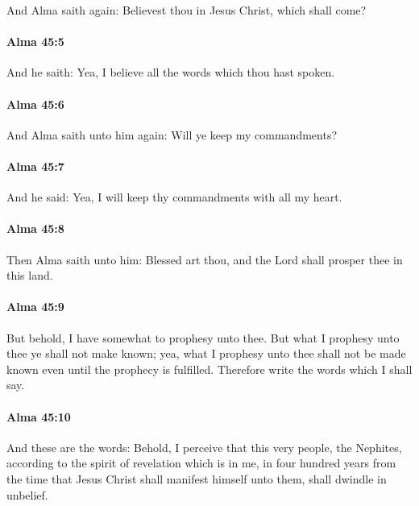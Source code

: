 			And Alma saith again:
			Believest thou in Jesus Christ, which shall come?

		\paragraph{Alma 45:5} %
			\label{ALMA-45-5}

			And he saith:
			Yea, I believe all the words which thou hast spoken.

		\paragraph{Alma 45:6} %
			\label{ALMA-45-6}

			And Alma saith unto him again:
			Will ye keep my commandments?

		\paragraph{Alma 45:7} %
			\label{ALMA-45-7}

			And he said:
			Yea, I will keep thy commandments with all my heart.

		\paragraph{Alma 45:8} %
			\label{ALMA-45-8}

			Then Alma saith unto him:
			Blessed art thou,
			and the Lord shall prosper thee in this land.

		\paragraph{Alma 45:9} %
			\label{ALMA-45-9}

			But behold, I have somewhat to prophesy unto thee.
			But what I prophesy unto thee ye shall not make known;
			yea, what I prophesy unto thee shall not be made known
			even until the prophecy is fulfilled.
			Therefore write the words which I shall say.

		\paragraph{Alma 45:10} %
			\label{ALMA-45-10}

			And these are the words:
			Behold, I perceive that this very people, the Nephites,
			according to the spirit of revelation which is in me,
			in four hundred years from the time
			that Jesus Christ shall manifest himself unto them,
			shall dwindle in unbelief.

